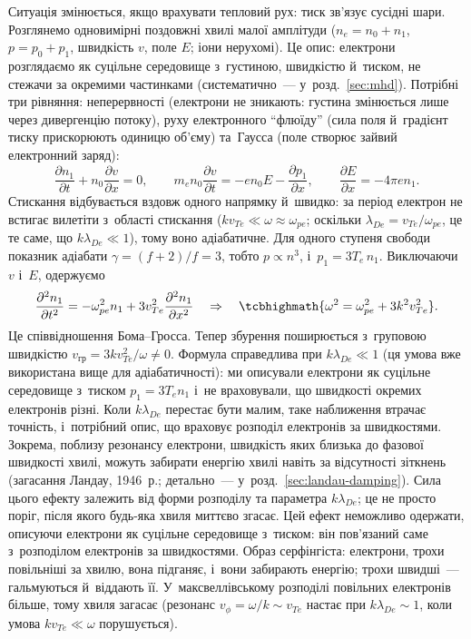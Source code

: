 Ситуація змінюється, якщо врахувати тепловий рух: тиск зв'язує сусідні шари. Розглянемо одновимірні поздовжні хвилі
малої амплітуди ($n_e=n_0+n_1$, $p=p_0+p_1$, швидкість $v$, поле $E$; іони нерухомі). Це  опис: електрони розглядаємо як суцільне середовище з~густиною, швидкістю й~тиском, не стежачи за окремими частинками (систематично~--- у~розд.~\ref{sec:mhd}). Потрібні три рівняння:
неперервності (електрони не зникають: густина змінюється лише через дивергенцію потоку),
руху електронного \enquote{флюїду} (сила поля й~градієнт тиску прискорюють одиницю об'єму) та~Гаусса (поле створює зайвий електронний заряд):
\begin{equation*}
	\frac{\partial n_1}{\partial t}+n_0\frac{\partial v}{\partial x}=0,\qquad
	m_en_0\frac{\partial v}{\partial t}=-en_0E-\frac{\partial p_1}{\partial x},\qquad
	\frac{\partial E}{\partial x}=-4\pi en_1.
\end{equation*}
Стискання відбувається вздовж одного напрямку й~швидко: за період електрон не встигає
вилетіти з~області стискання ($kv_{Te}\ll\omega\approx\omega_{pe}$; оскільки $\lambda_{De}=v_{Te}/\omega_{pe}$, це те саме, що $k\lambda_{De}\ll1$), тому воно адіабатичне.
Для одного ступеня свободи показник адіабати $\gamma=(f+2)/f=3$, тобто $p\propto n^3$,
і~$p_1=3T_e\,n_1$. Виключаючи $v$ і~$E$, одержуємо
\begin{equation}\label{eq:bohm-gross}
	\frac{\partial^2n_1}{\partial t^2}=-\omega_{pe}^2n_1+3v_{Te}^2\frac{\partial^2n_1}{\partial x^2}
	\quad\Rightarrow\quad
	\tcbhighmath{\omega^2=\omega_{pe}^2+3k^2v_{Te}^2}.
\end{equation}
Це співвідношення Бома--Гросса. Тепер збурення поширюється з~груповою
швидкістю $v_{\mathrm{гр}}=3kv_{Te}^2/\omega\neq0$. Формула справедлива при
$k\lambda_{De}\ll1$ (ця умова вже використана вище для адіабатичності): ми описували електрони як суцільне середовище з~тиском
$p_1=3T_en_1$ і~не враховували, що швидкості окремих електронів різні. Коли
$k\lambda_{De}$ перестає бути малим, таке наближення втрачає точність, і~потрібний опис,
що враховує розподіл електронів за швидкостями. Зокрема, поблизу резонансу електрони, швидкість
яких близька до фазової швидкості хвилі, можуть забирати енергію хвилі навіть за
відсутності зіткнень (загасання Ландау, 1946~р.; детально~--- у~розд.~\ref{sec:landau-damping}). Сила цього ефекту залежить від форми
розподілу та параметра $k\lambda_{De}$; це не просто поріг, після якого будь-яка хвиля
миттєво згасає. Цей ефект неможливо одержати, описуючи електрони як суцільне середовище
з~тиском: він пов'язаний саме з~розподілом електронів за швидкостями. Образ серфінгіста: електрони, трохи повільніші за хвилю, вона підганяє, і~вони забирають енергію;
трохи швидші~--- гальмуються й~віддають її. У~максвеллівському розподілі повільних електронів більше, тому хвиля загасає
(резонанс $v_\phi=\omega/k\sim v_{Te}$ настає при $k\lambda_{De}\sim1$, коли умова $kv_{Te}\ll\omega$ порушується).

